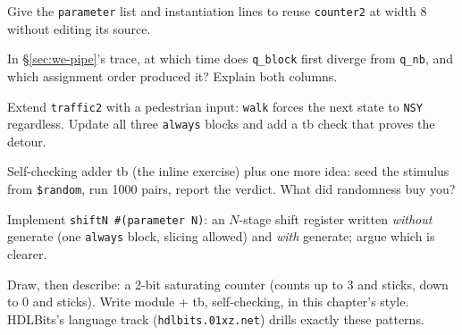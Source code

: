 \begin{exercise}[medium]
Give the \texttt{parameter} list and instantiation lines to reuse
\texttt{counter2} at width 8 without editing its source.
\end{exercise}
\begin{exercise}[medium]
In \S\ref{sec:we-pipe}'s trace, at which time does \texttt{q\_block}
first diverge from \texttt{q\_nb}, and which assignment order produced
it? Explain both columns.
\end{exercise}
\begin{exercise}[hard]
Extend \texttt{traffic2} with a pedestrian input: \texttt{walk} forces
the next state to \texttt{NSY} regardless. Update all three
\texttt{always} blocks and add a tb check that proves the detour.
\end{exercise}
\begin{exercise}[hard]
Self-checking adder tb (the inline exercise) plus one more idea: seed
the stimulus from \texttt{\$random}, run 1000 pairs, report the verdict.
What did randomness buy you?
\end{exercise}
\begin{exercise}[hard]
Implement \texttt{shiftN \#(parameter N)}: an $N$-stage shift register
written \emph{without} generate (one \texttt{always} block, slicing
allowed) and \emph{with} generate; argue which is clearer.
\end{exercise}
\begin{exercise}[hard]
Draw, then describe: a 2-bit saturating counter (counts up to 3 and
sticks, down to 0 and sticks). Write module + tb, self-checking, in
this chapter's style. HDLBits's language track
(\texttt{hdlbits.01xz.net}) drills exactly these patterns.
\end{exercise}

